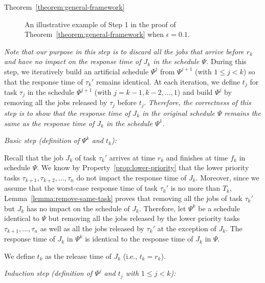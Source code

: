 \begin{appProof}{Theorem~\ref{theorem:general-framework}}


\begin{figure*}[t]
  \centering
\caption{An illustrative example of Step 1 in the proof of Theorem~\ref{theorem:general-framework} when $\epsilon = 0.1$.}
\label{fig:example}  
\end{figure*}



\emph{Note that our purpose in this step is to discard all the jobs that arrive before $r_k$ and have no impact on the response time of $J_k$ in the schedule
  $\Psi$. } During this step, we iteratively build an artificial schedule $\Psi^j$ from $\Psi^{j+1}$ (with $1 \leq j < k$) so that the response time of $\tau_{k}'$ remains identical. At each iteration, we define $t_j$ for task $\tau_j$ in the schedule $\Psi^{j+1}$ (with $j=k-1, k-2, \ldots, 1$) and build $\Psi^j$ by removing all the jobs released by $\tau_j$ before $t_j$. \emph{Therefore, the correctness of this step is to show that the response time of $J_k$ in the original schedule $\Psi$ remains the same as the response time of $J_k$ in the schedule $\Psi^1$.}


\noindent\textit{Basic step (definition of $\Psi^k$ and $t_k$):} 

Recall that the job $J_{k}$ of task $\tau_k'$ arrives at time $r_k$ and finishes at time $f_k$ in schedule $\Psi$. We know by Property~\ref{prop:lower-priority} that the lower priority tasks $\tau_{k+1}, \tau_{k+2}, \ldots, \tau_n$ do not impact the response time of $J_{k}$. Moreover, since we assume that the worst-case response time of task $\tau_k'$ is no more than $T_k$, Lemma~\ref{lemma:remove-same-task} proves that removing all the jobs of task $\tau_k'$ but $J_{k}$ has no impact on the schedule of $J_{k}$. Therefore, let $\Psi^k$ be a schedule identical to $\Psi$ but removing all the jobs released by the lower priority tasks $\tau_{k+1}, \ldots, \tau_n$ as well as all the jobs released by $\tau_k'$ at the exception of $J_{k}$. The response time of $J_{k}$ in $\Psi^{k}$ is identical to the response time of $J_{k}$ in $\Psi$.

We define $t_k$ as the release time of $J_k$ (i.e., $t_k = r_k$).


\noindent\textit{Induction step (definition of $\Psi^j$ and $t_j$ with $1 \leq j < k$):}


\end{appProof}
